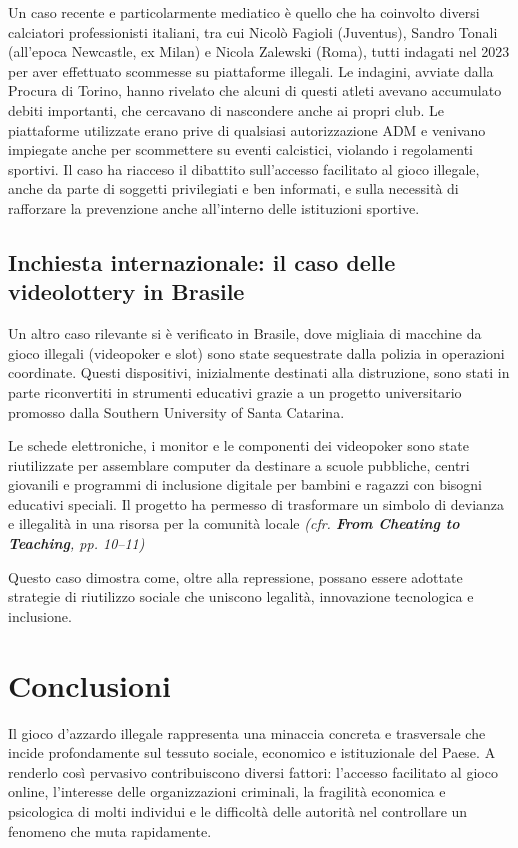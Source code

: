 \documentclass[a4paper,12pt]{article}
\begin{document}
Un caso recente e particolarmente mediatico è quello che ha coinvolto diversi calciatori professionisti italiani, tra cui Nicolò Fagioli (Juventus), Sandro Tonali (all’epoca Newcastle, ex Milan) e Nicola Zalewski (Roma), tutti indagati nel 2023 per aver effettuato scommesse su piattaforme illegali. Le indagini, avviate dalla Procura di Torino, hanno rivelato che alcuni di questi atleti avevano accumulato debiti importanti, che cercavano di nascondere anche ai propri club. Le piattaforme utilizzate erano prive di qualsiasi autorizzazione ADM e venivano impiegate anche per scommettere su eventi calcistici, violando i regolamenti sportivi. Il caso ha riacceso il dibattito sull’accesso facilitato al gioco illegale, anche da parte di soggetti privilegiati e ben informati, e sulla necessità di rafforzare la prevenzione anche all’interno delle istituzioni sportive.

\subsection{Inchiesta internazionale: il caso delle videolottery in Brasile}

Un altro caso rilevante si è verificato in Brasile, dove migliaia di macchine da gioco illegali (videopoker e slot) sono state sequestrate dalla polizia in operazioni coordinate. Questi dispositivi, inizialmente destinati alla distruzione, sono stati in parte riconvertiti in strumenti educativi grazie a un progetto universitario promosso dalla Southern University of Santa Catarina.

Le schede elettroniche, i monitor e le componenti dei videopoker sono state riutilizzate per assemblare computer da destinare a scuole pubbliche, centri giovanili e programmi di inclusione digitale per bambini e ragazzi con bisogni educativi speciali. Il progetto ha permesso di trasformare un simbolo di devianza e illegalità in una risorsa per la comunità locale \textit{(cfr. \textbf{From Cheating to Teaching}, pp. 10--11)} \cite{bento2010cheating}

Questo caso dimostra come, oltre alla repressione, possano essere adottate strategie di riutilizzo sociale che uniscono legalità, innovazione tecnologica e inclusione.

\section{Conclusioni}

Il gioco d’azzardo illegale rappresenta una minaccia concreta e trasversale che incide profondamente sul tessuto sociale, economico e istituzionale del Paese. A renderlo così pervasivo contribuiscono diversi fattori: l’accesso facilitato al gioco online, l’interesse delle organizzazioni criminali, la fragilità economica e psicologica di molti individui e le difficoltà delle autorità nel controllare un fenomeno che muta rapidamente.
\end{document}
